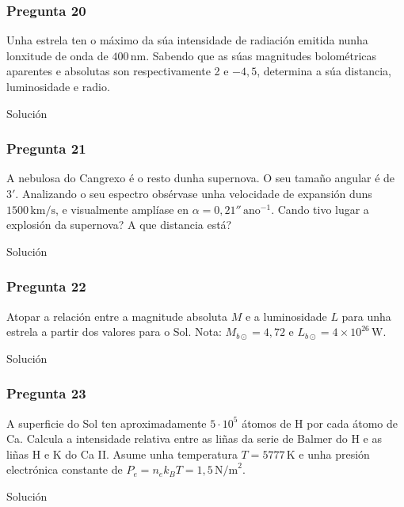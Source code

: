 \vspace*{2em}

\begin{Enunciado}
	\subsubsection{Pregunta 20}

	Unha estrela ten o máximo da súa intensidade de radiación emitida nunha lonxitude de onda de $400\,\text{nm}$. Sabendo que as súas magnitudes bolométricas aparentes e absolutas son respectivamente 2 e $-4{,}5$, determina a súa distancia, luminosidade e radio.

\end{Enunciado}
Solución

\vspace*{2em}

\begin{Enunciado}
	\subsubsection{Pregunta 21}

	A nebulosa do Cangrexo é o resto dunha supernova. O seu tamaño angular é de $3'$. Analizando o seu espectro obsérvase unha velocidade de expansión duns $1500\,\text{km/s}$, e visualmente amplíase en $\alpha = 0{,}21''\,\text{ano}^{-1}$. Cando tivo lugar a explosión da supernova? A que distancia está?

\end{Enunciado}
Solución

\vspace*{2em}

\begin{Enunciado}
	\subsubsection{Pregunta 22}

	Atopar a relación entre a magnitude absoluta $M$ e a luminosidade $L$ para unha estrela a partir dos valores para o Sol. Nota: $M_{b\odot} = 4{,}72$ e $L_{b\odot} = 4 \times 10^{26}\,\text{W}$.

\end{Enunciado}
Solución

\vspace*{2em}

\begin{Enunciado}
	\subsubsection{Pregunta 23}

	A superficie do Sol ten aproximadamente $5 \cdot 10^5$ átomos de H por cada átomo de Ca. Calcula a intensidade relativa entre as liñas da serie de Balmer do H e as liñas H e K do Ca II. Asume unha temperatura $T = 5777\,\text{K}$ e unha presión electrónica constante de $P_e = n_e k_B T = 1{,}5\,\text{N/m}^2$.

\end{Enunciado}
Solución

